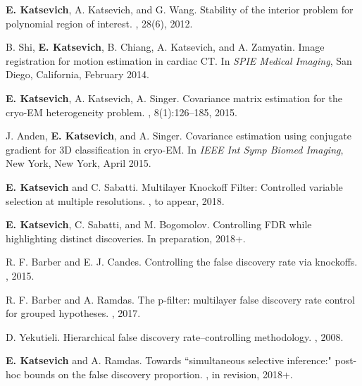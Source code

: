 \documentclass[11pt]{article}
\begin{document}
\begin{footnotesize}

\begin{thebibliography}{}


{\bf E. Katsevich}, A. Katsevich, and G. Wang.
\newblock Stability of the interior problem for polynomial region of interest.
, 28(6), 2012.

B. Shi, {\bf E. Katsevich}, B. Chiang, A. Katsevich, and A. Zamyatin.
\newblock Image registration for motion estimation in cardiac CT.
\newblock In {\em SPIE Medical Imaging}, San Diego, California, February 2014.

{\bf E. Katsevich}, A. Katsevich, A. Singer. 
\newblock Covariance matrix estimation for the cryo-EM heterogeneity problem.
, 8(1):126--185, 2015.

J. Anden, {\bf E. Katsevich}, and A. Singer.
\newblock Covariance estimation using conjugate gradient for 3D classification in cryo-EM.
\newblock In {\em IEEE Int Symp Biomed Imaging}, New York, New York, April 2015.

{\bf E. Katsevich} and C. Sabatti. 
\newblock Multilayer Knockoff Filter: Controlled variable selection at multiple resolutions.
, to appear, 2018.

{\bf E. Katsevich}, C. Sabatti, and M. Bogomolov. 
\newblock Controlling FDR while highlighting distinct discoveries.
\newblock In preparation, 2018+.

R. F. Barber and E. J. Candes.
\newblock Controlling the false discovery rate via knockoffs.
, 2015.


R. F. Barber and A. Ramdas.
\newblock The p-filter: multilayer false discovery rate control for grouped hypotheses.
, 2017.



D. Yekutieli. 
\newblock Hierarchical false discovery rate--controlling methodology.
, 2008.


{\bf E. Katsevich} and A. Ramdas. 
\newblock Towards ``simultaneous selective inference:" post-hoc bounds on the false discovery proportion.
, in revision, 2018+.


\end{thebibliography}
\end{footnotesize}
\end{document}
